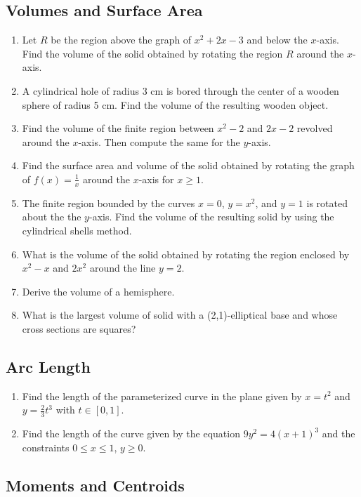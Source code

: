 \documentclass{article}
\begin{document}
\subsection{Volumes and Surface Area}
\begin{enumerate}
\item Let $R$ be the region above the graph of $x^2+2x-3$ and below the $x$-axis. Find the volume of the solid obtained by rotating the region $R$ around the $x$-axis.
\item A cylindrical hole of radius 3 cm is bored through the center of a wooden sphere of radius 5 cm. Find the volume of the resulting wooden object.
\item Find the volume of the finite region between $x^2-2$ and $2x-2$ revolved around the $x$-axis. Then compute the same for the $y$-axis.
\item Find the surface area and volume of the solid obtained by rotating the graph of $f(x)=\frac{1}{x}$ around the $x$-axis for $x\geq1$.
\item The finite region bounded by the curves $x = 0$, $y = x^2$, and $y = 1$ is rotated about the the $y$-axis. Find the volume of the resulting solid by using the cylindrical shells method.
\item What is the volume of the solid obtained by rotating the region enclosed by $x^2-x$ and $2x^2$ around the line $y=2$.
\item Derive the volume of a hemisphere.
\item What is the largest volume of solid with a (2,1)-elliptical base and whose cross sections are squares?
\end{enumerate}



\subsection{Arc Length}

\begin{enumerate}
\item Find the length of the parameterized curve in the plane given by $x=t^2$ and $y=\frac{2}{3}t^3$ with $t\in[0,1]$.
\item Find the length of the curve given by the equation $9y^2=4(x+1)^3$ and the constraints $0 \leq x \leq 1$, $y \geq 0$.
\end{enumerate}


\subsection{Moments and Centroids}
\end{document}
